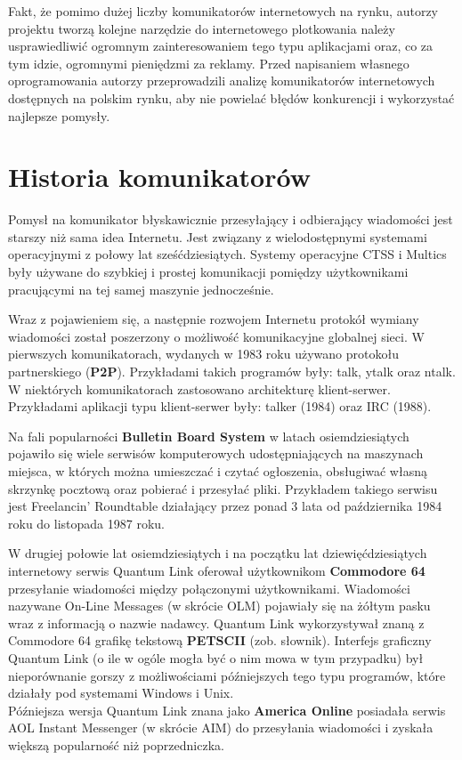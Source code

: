 \documentclass[a4paper,12pt]{article}
\begin{document}
\par Fakt, że pomimo dużej liczby komunikatorów internetowych na rynku, autorzy projektu tworzą kolejne narzędzie do internetowego plotkowania należy usprawiedliwić ogromnym zainteresowaniem tego typu aplikacjami oraz, co za tym idzie, ogromnymi pieniędzmi za reklamy. Przed napisaniem własnego oprogramowania autorzy przeprowadzili analizę komunikatorów internetowych dostępnych na polskim rynku, aby nie powielać błędów konkurencji i wykorzystać najlepsze pomysły.

\section[Historia komunikatorów]{Historia komunikatorów}
Pomysł na komunikator błyskawicznie przesyłający i odbierający wiadomości jest starszy niż sama idea Internetu. Jest związany z wielodostępnymi systemami operacyjnymi z połowy lat sześćdziesiątych. Systemy operacyjne CTSS i Multics były używane do szybkiej i prostej komunikacji pomiędzy użytkownikami pracującymi na tej samej maszynie jednocześnie.

\par Wraz z pojawieniem się, a następnie rozwojem Internetu protokół wymiany wiadomości został poszerzony o możliwość komunikacyjne globalnej sieci. W pierwszych komunikatorach, wydanych w 1983 roku używano protokołu
partnerskiego (\textbf{P2P}). Przykładami takich programów były: talk, ytalk oraz ntalk.
W niektórych komunikatorach zastosowano architekturę klient-serwer. Przykładami aplikacji typu klient-serwer były: talker (1984) oraz IRC (1988).

\newpage 
Na fali popularności \textbf{Bulletin Board System} w latach osiemdziesiątych pojawiło się wiele serwisów komputerowych udostępniających na maszynach miejsca, w których można umieszczać i czytać ogłoszenia, obsługiwać własną skrzynkę pocztową oraz pobierać i przesyłać pliki.
Przykładem takiego serwisu jest Freelancin' Roundtable działający przez ponad 3 lata od października 1984 roku do listopada 1987 roku.

\par W drugiej połowie lat osiemdziesiątych i na początku lat dziewięćdziesiątych internetowy serwis Quantum Link oferował użytkownikom \textbf{Commodore 64} przesyłanie wiadomości między połączonymi użytkownikami. Wiadomości nazywane On-Line Messages (w skrócie OLM) pojawiały się na żółtym pasku wraz z informacją o nazwie nadawcy. Quantum Link wykorzystywał znaną z Commodore 64 grafikę tekstową \textbf{PETSCII} (zob. słownik). Interfejs graficzny Quantum Link  (o ile w ogóle mogła być o nim mowa w tym przypadku) był nieporównanie gorszy z możliwościami późniejszych tego typu programów, które działały pod systemami Windows i Unix.\\
Późniejsza wersja Quantum Link znana jako \textbf{America Online} posiadała serwis AOL Instant Messenger (w skrócie AIM) do przesyłania wiadomości i zyskała większą popularność niż poprzedniczka.
\end{document}
